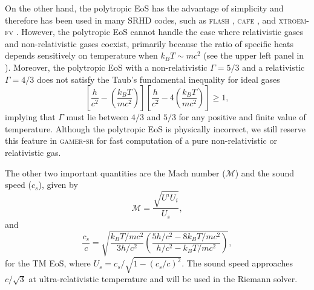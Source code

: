 \documentclass[twocolumn]{aastex63}
\begin{document}
On the other hand, the polytropic EoS has the advantage of simplicity and therefore has been used in many SRHD codes, such as \textsc{flash} \citep{FLASH}, \textsc{cafe} \citep{CAFE}, and \textsc{xtroem-fv} \citep{XTROEM}. However, the polytropic EoS cannot handle the case where relativistic gases  and non-relativistic gases coexist, primarily because the ratio of specific heats depends sensitively on temperature when $k_{B}T \sim mc^2$ (see the upper left panel in ). Moreover, the polytropic EoS with a non-relativistic $\Gamma=5/3$ and a relativistic $\Gamma=4/3$ does not satisfy the Taub's fundamental inequality for ideal gases \citep{Taub}
\begin{equation}
    \left[\frac{h}{c^2}-\left(\frac{k_B T}{mc^2}\right)\right]
    \left[\frac{h}{c^2}-4\left(\frac{k_B T}{mc^2}\right)\right]
    \geq 1,
\end{equation}
implying that $\Gamma$ must lie between $4/3$ and $5/3$ for any positive and finite value of temperature. Although the polytropic EoS is physically incorrect, we still reserve this feature in \textsc{gamer-sr} for fast computation of a pure non-relativistic or relativistic gas.

The other two important quantities are the Mach number ($\mathscr{M}$) and the sound speed ($c_{s}$), given by
\begin{equation}
    \mathscr{M}=\frac{\sqrt{U^iU_i}}{U_{s}},
    \label{eq:MachNumber}
\end{equation}
and
\begin{equation}
\frac{c_{s}}{c} = \sqrt{\frac{k_{B}T/mc^{2}}{3h/c^2}\left(\frac{5h/c^2-8k_{B}T/mc^{2}}{h/c^2-k_{B}T/mc^{2}}\right)},
\label{sound_speed}
\end{equation}
for the TM EoS, where $U_{s}=c_{s}/\sqrt{1-\left(c_{s}/c\right)^2}$. The sound speed approaches $c/\sqrt{3}$ at ultra-relativistic temperature and will be used in the Riemann solver.
\end{document}
